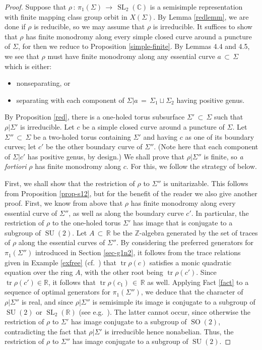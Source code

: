 \documentclass[reqno]{amsart}
\theoremstyle{plain}
\theoremstyle{definition}
\theoremstyle{remark}
\newcommand{\C}{{\mathbb{C}}}
\newcommand{\R}{{\mathbb{R}}}
\newcommand{\Z}{{\mathbb{Z}}}
\DeclareMathOperator{\SL}{SL}
\DeclareMathOperator{\SO}{SO}
\DeclareMathOperator{\SU}{SU}
\DeclareMathOperator{\tr}{tr}
\begin{document}
\begin{proof}
Suppose that $\rho\,:\,\pi_1(\Sigma)\,\to\,\SL_2(\C)$ is a semisimple representation with finite mapping class
group orbit in $X(\Sigma)$. By Lemma \ref{redlemm}, we are done if $\rho$ is reducible, so we may assume
that $\rho$ is irreducible. It suffices to show that $\rho$ has finite monodromy along every simple
closed curve around a puncture of $\Sigma$, for then we reduce to Proposition \ref{simple-finite}. By
Lemmas 4.4 and 4.5, we see that $\rho$ must have finite monodromy along any essential curve $a\,\subset\,
\Sigma$ which is either:
\begin{itemize}
	\item nonseparating, or
	\item separating with each component of $\Sigma|a\,=\,\Sigma_1\sqcup\Sigma_2$ having positive genus.
\end{itemize}
By Proposition \ref{red}, there is a one-holed torus subsurface $\Sigma'\,\subset\,\Sigma$ such that
$\rho|\Sigma'$ is irreducible. Let $c$ be a simple closed curve around a puncture of $\Sigma$. Let $\Sigma''
\,\subset\,\Sigma$ be a two-holed torus containing $\Sigma'$ and having $c$ as one of its boundary
curves; let $c'$ be the other boundary curve of $\Sigma''$. (Note here that each component of $\Sigma|c'$ has
positive genus, by design.) We shall prove that $\rho|\Sigma''$ is finite, so \emph{a fortiori} $\rho$ has
finite monodromy along $c$. For this, we follow the strategy of \cite{psw} below.

First, we shall show that the restriction of $\rho$ to $\Sigma''$ is unitarizable. This follows from 
Proposition \ref{prop-s12}, but for the benefit of the reader we also give another proof. First, we know from 
above that $\rho$ has finite monodromy along every essential curve of $\Sigma''$, as well as along the boundary 
curve $c'$. In particular, the restriction of $\rho$ to the one-holed torus $\Sigma'$ has image that is 
conjugate to a subgroup of $\SU(2)$. Let $A\,\subset\,\R$ be the $\Z$-algebra generated by the set of traces of 
$\rho$ along the essential curves of $\Sigma''$. By considering the preferred generators for $\pi_1(\Sigma'')$ 
introduced in Section \ref{sec-g1n2}, it follows from the trace relations given in Example \ref{exfree} 
(cf.~\cite[Section 5.3]{goldman2}) that $\tr\rho(c)$ satisfies a monic quadratic equation over the ring $A$, 
with the other root being $\tr\rho(c')$. Since $\tr\rho(c')\in\R$, it follows that $\tr\rho(c_1)\,\in\,\R$ as well. 
Applying Fact \ref{fact} to a sequence of optimal generators for $\pi_1(\Sigma'')$, we deduce that the 
character of $\rho|\Sigma''$ is real, and since $\rho|\Sigma''$ is semisimple its image is conjugate to a 
subgroup of $\SU(2)$ or $\SL_2(\R)$ (see e.g.~\cite[Proposition III.1.1]{ms}). The latter cannot occur, since 
otherwise the restriction of $\rho$ to $\Sigma'$ has image conjugate to a subgroup of $\SO(2)$, contradicting 
the fact that $\rho|\Sigma'$ is irreducible hence nonabelian. Thus, the restriction of $\rho$ to $\Sigma''$ has 
image conjugate to a subgroup of $\SU(2)$.


\end{proof}
\end{document}
